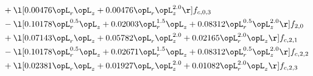 \begin{alignat}{2}
& + \l[  0.00476 \opL_r \opL_z +  0.00476 \opL_r \opL_z^{2.0}  \r] f_{c,0,3} \nonumber \\ 
& - \l[  0.10178 \opL_r^{0.5} \opL_z +  0.02003 \opL_r^{1.5} \opL_z +  0.08312 \opL_r^{0.5} \opL_z^{2.0}  \r] f_{2,0} \nonumber \\ 
& + \l[  0.07143 \opL_r \opL_z +  0.05782 \opL_r \opL_z^{2.0} +  0.02165 \opL_r^{2.0} \opL_z  \r] f_{c,2,1} \nonumber \\ 
& - \l[  0.10178 \opL_r^{0.5} \opL_z +  0.02671 \opL_r^{1.5} \opL_z +  0.08312 \opL_r^{0.5} \opL_z^{2.0}  \r] f_{c,2,2} \nonumber \\ 
& + \l[  0.02381 \opL_r \opL_z +  0.01927 \opL_r \opL_z^{2.0} +  0.01082 \opL_r^{2.0} \opL_z  \r] f_{c,2,3} \nonumber \\ 
\end{alignat} 


